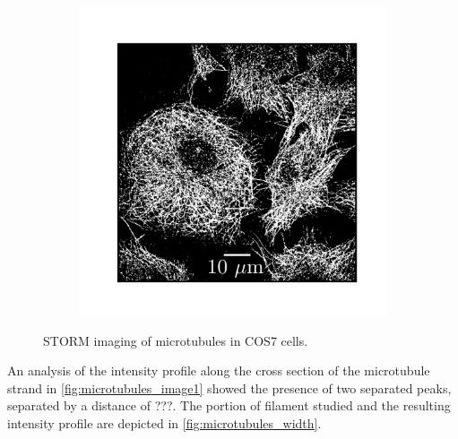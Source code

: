 \begin{figure}
\begin{subfigure}{0.32\textwidth}
        \caption{}
        \label{fig:microtubules_image2}
    \end{subfigure}
    \begin{subfigure}{0.32\textwidth}
        \includegraphics[width=\textwidth]{figures/microtubules_image6.png}
        \caption{}
        \label{fig:microtubules_image3}
    \end{subfigure}
    \caption{STORM imaging of microtubules in COS7 cells.}
    \label{fig:microtubules_images}
\end{figure}
%
An analysis of the intensity profile along the cross section of the microtubule strand in \autoref{fig:microtubules_image1} showed the presence of two separated peaks, separated by a distance of ???.
The portion of filament studied and the resulting intensity profile are depicted in \autoref{fig:microtubules_width}.
%
